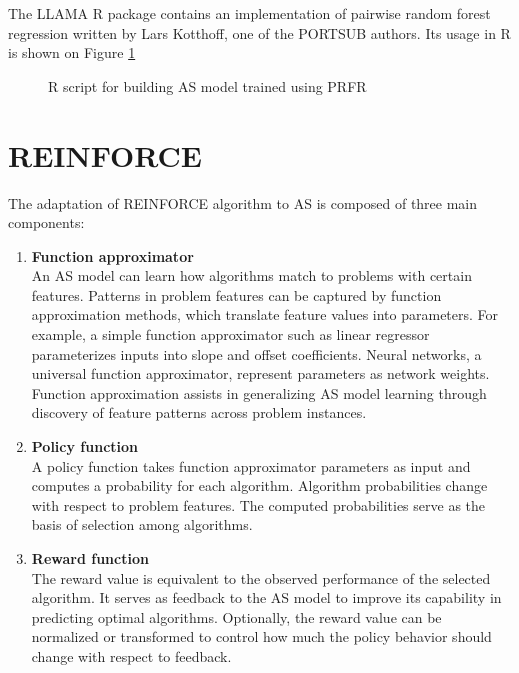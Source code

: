 The LLAMA R package contains an implementation of pairwise random forest regression written by Lars Kotthoff, one of the PORTSUB authors. Its usage in R is shown on Figure \ref{fig:prfr}

\begin{figure}[H]
	\centering
	\caption{R script for building AS model trained using PRFR}
	\label{fig:prfr}
\end{figure}

\section{REINFORCE}

The adaptation of REINFORCE algorithm to AS is composed of three main components:

\begin{enumerate}
	\item \textbf{Function approximator} \\
	An AS model can learn how algorithms match to problems with certain features. Patterns in problem features can be captured by function approximation methods, which translate feature values into parameters. For example, a simple function approximator such as linear regressor parameterizes inputs into slope and offset coefficients. Neural networks, a universal function approximator, represent parameters as network weights. Function approximation assists in generalizing AS model learning through discovery of feature patterns across problem instances.
	
	\item \textbf{Policy function} \\
	A policy function takes function approximator parameters as input and computes a probability for each algorithm. Algorithm probabilities change with respect to problem features. The computed probabilities serve as the basis of selection among algorithms.   
	
	\item \textbf{Reward function} \\
	The reward value is equivalent to the observed performance of the selected algorithm. It serves as feedback to the AS model to improve its capability in predicting optimal algorithms. Optionally, the reward value can be normalized or transformed to control how much the policy behavior should change with respect to feedback.  
\end{enumerate}


